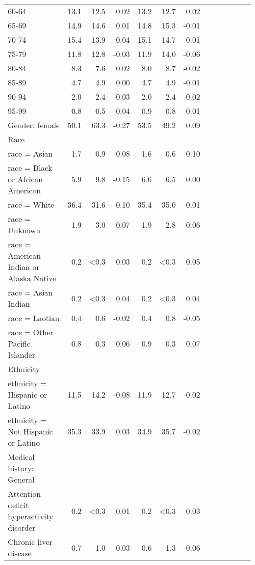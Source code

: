 \documentclass[11pt,]{article}
\begin{document}
\begin{longtable}{lrrrrrrrrrrrr}
      60-64 & 13.1 & 12.5 &  0.02 & 13.2 & 12.7 &  0.02 \\ 
      65-69 & 14.9 & 14.6 &  0.01 & 14.8 & 15.3 & -0.01 \\ 
      70-74 & 15.4 & 13.9 &  0.04 & 15.1 & 14.7 &  0.01 \\ 
      75-79 & 11.8 & 12.8 & -0.03 & 11.9 & 14.0 & -0.06 \\ 
      80-84 &  8.3 &  7.6 &  0.02 &  8.0 &  8.7 & -0.02 \\ 
      85-89 &  4.7 &  4.9 &  0.00 &  4.7 &  4.9 & -0.01 \\ 
      90-94 &  2.0 &  2.4 & -0.03 &  2.0 &  2.4 & -0.02 \\ 
      95-99 &  0.8 &  0.5 &  0.04 &  0.9 &  0.8 &  0.01 \\ 
  Gender: female & 50.1 & 63.3 & -0.27 & 53.5 & 49.2 &  0.09 \\ 
  Race &    &    &     &    &    &     \\ 
      race = Asian &  1.7 &  0.9 &  0.08 &  1.6 &  0.6 &  0.10 \\ 
      race = Black or African American &  5.9 &  9.8 & -0.15 &  6.6 &  6.5 &  0.00 \\ 
      race = White & 36.4 & 31.6 &  0.10 & 35.4 & 35.0 &  0.01 \\ 
      race = Unknown &  1.9 &  3.0 & -0.07 &  1.9 &  2.8 & -0.06 \\ 
      race = American Indian or Alaska Native &  0.2 & <0.3 &  0.03 &  0.2 & <0.3 &  0.05 \\ 
      race = Asian Indian &  0.2 & <0.3 &  0.04 &  0.2 & <0.3 &  0.04 \\ 
      race = Laotian &  0.4 &  0.6 & -0.02 &  0.4 &  0.8 & -0.05 \\ 
      race = Other Pacific Islander &  0.8 &  0.3 &  0.06 &  0.9 &  0.3 &  0.07 \\ 
  Ethnicity &    &    &     &    &    &     \\ 
      ethnicity = Hispanic or Latino & 11.5 & 14.2 & -0.08 & 11.9 & 12.7 & -0.02 \\ 
      ethnicity = Not Hispanic or Latino & 35.3 & 33.9 &  0.03 & 34.9 & 35.7 & -0.02 \\ 
  Medical history: General &    &    &     &    &    &     \\ 
      Attention deficit hyperactivity disorder &  0.2 & <0.3 &  0.01 &  0.2 & <0.3 &  0.03 \\ 
      Chronic liver disease &  0.7 &  1.0 & -0.03 &  0.6 &  1.3 & -0.06 \\ 

\end{longtable}
\end{document}
